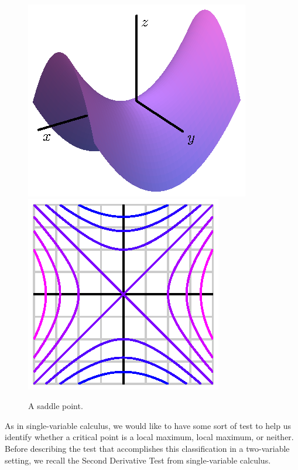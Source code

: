 \begin{figure}[ht]
  \begin{center}
    \includegraphics{figures/saddle.eps}
    \hspace*{20pt}
    \includegraphics{figures/saddle_contours.eps}
  \end{center}
  \caption{A saddle point.}
  \label{F:10.7.saddle}
\end{figure}

As in single-variable calculus, we would like to have some sort of test to help us identify whether a critical point is a local maximum, local maximum, or neither.  Before describing the test that accomplishes this classification in a two-variable setting, we recall the Second Derivative Test
from single-variable calculus.

\vspace*{5pt}
\nin {}
\vspace*{5pt}

